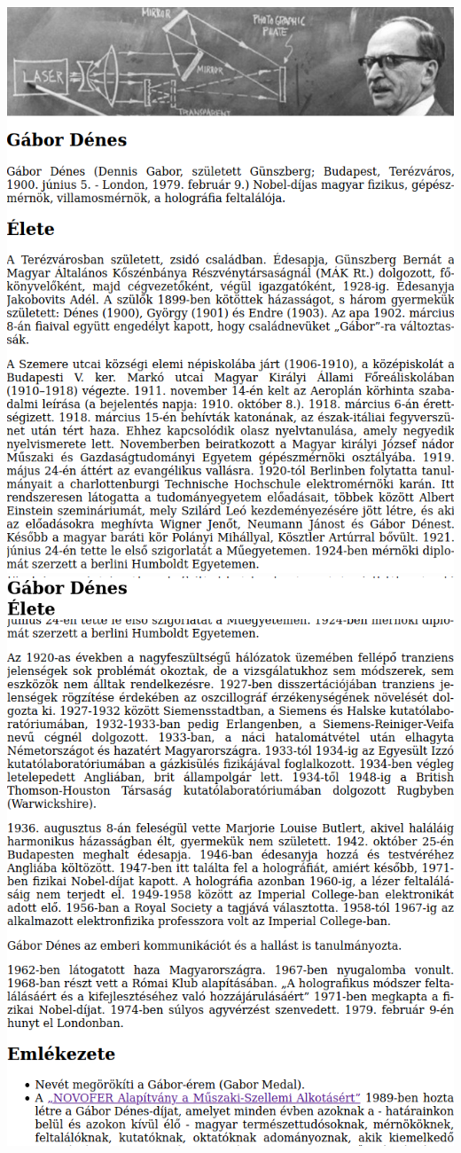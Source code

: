 \begin{frame}
\begin{columns}[T]
      \includegraphics[width=\textwidth]{gabor2.png}
      \includegraphics[width=\textwidth]{gabor3.png}
  \end{columns}
\end{frame}

